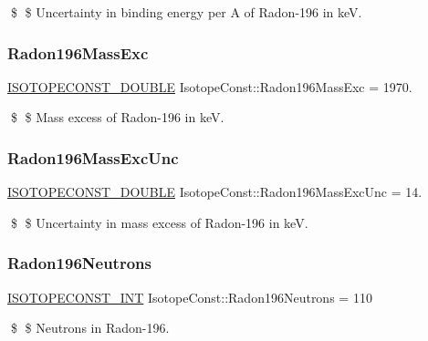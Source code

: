 \$ \$ Uncertainty in binding energy per A of Radon-\/196 in keV. \mbox{\label{group___isotope_const-_radon-_rn196_gaa28963c39c01a563f7c80a6a9b49a00a}} 
\subsubsection{\texorpdfstring{Radon196\+Mass\+Exc}{Radon196MassExc}}
{\footnotesize\ttfamily \mbox{\hyperlink{group___isotope_const-_macros_ga8f45a7272ce02c0b4c65c44636ed719a}{I\+S\+O\+T\+O\+P\+E\+C\+O\+N\+S\+T\+\_\+\+D\+O\+U\+B\+LE}} Isotope\+Const\+::\+Radon196\+Mass\+Exc = 1970.}

\$ \$ Mass excess of Radon-\/196 in keV. \mbox{\label{group___isotope_const-_radon-_rn196_gaf144345b965ef065d05f4aecd610e176}} 
\subsubsection{\texorpdfstring{Radon196\+Mass\+Exc\+Unc}{Radon196MassExcUnc}}
{\footnotesize\ttfamily \mbox{\hyperlink{group___isotope_const-_macros_ga8f45a7272ce02c0b4c65c44636ed719a}{I\+S\+O\+T\+O\+P\+E\+C\+O\+N\+S\+T\+\_\+\+D\+O\+U\+B\+LE}} Isotope\+Const\+::\+Radon196\+Mass\+Exc\+Unc = 14.}

\$ \$ Uncertainty in mass excess of Radon-\/196 in keV. \mbox{\label{group___isotope_const-_radon-_rn196_ga2be1973a720191df3edabb79d439c808}} 
\subsubsection{\texorpdfstring{Radon196\+Neutrons}{Radon196Neutrons}}
{\footnotesize\ttfamily \mbox{\hyperlink{group___isotope_const-_macros_ga5f18360b3e99483a35c32d789e62621c}{I\+S\+O\+T\+O\+P\+E\+C\+O\+N\+S\+T\+\_\+\+I\+NT}} Isotope\+Const\+::\+Radon196\+Neutrons = 110}

\$ \$ Neutrons in Radon-\/196. \mbox{\label{group___isotope_const-_radon-_rn196_gaa46557f2059d54bd108253ced644f9d4}} 

